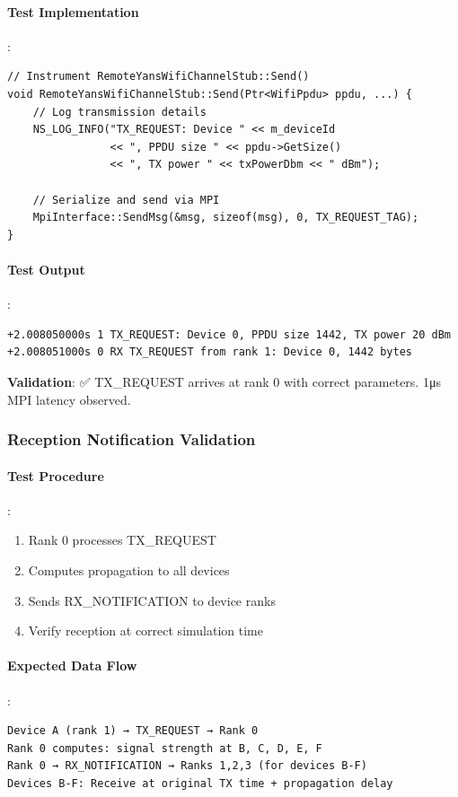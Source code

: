 \paragraph{Test Implementation}:
\begin{lstlisting}[style=cpp]
// Instrument RemoteYansWifiChannelStub::Send()
void RemoteYansWifiChannelStub::Send(Ptr<WifiPpdu> ppdu, ...) {
    // Log transmission details
    NS_LOG_INFO("TX_REQUEST: Device " << m_deviceId 
                << ", PPDU size " << ppdu->GetSize()
                << ", TX power " << txPowerDbm << " dBm");
    
    // Serialize and send via MPI
    MpiInterface::SendMsg(&msg, sizeof(msg), 0, TX_REQUEST_TAG);
}
\end{lstlisting}

\paragraph{Test Output}:
\begin{verbatim}
+2.008050000s 1 TX_REQUEST: Device 0, PPDU size 1442, TX power 20 dBm
+2.008051000s 0 RX TX_REQUEST from rank 1: Device 0, 1442 bytes
\end{verbatim}

\textbf{Validation}: ✅ TX\_REQUEST arrives at rank 0 with correct parameters. 1μs MPI latency observed.

\subsubsection{Reception Notification Validation}

\paragraph{Test Procedure}:
\begin{enumerate}
    \item Rank 0 processes TX\_REQUEST
    \item Computes propagation to all devices
    \item Sends RX\_NOTIFICATION to device ranks
    \item Verify reception at correct simulation time
\end{enumerate}

\paragraph{Expected Data Flow}:
\begin{verbatim}
Device A (rank 1) → TX_REQUEST → Rank 0
Rank 0 computes: signal strength at B, C, D, E, F
Rank 0 → RX_NOTIFICATION → Ranks 1,2,3 (for devices B-F)
Devices B-F: Receive at original TX time + propagation delay
\end{verbatim}

